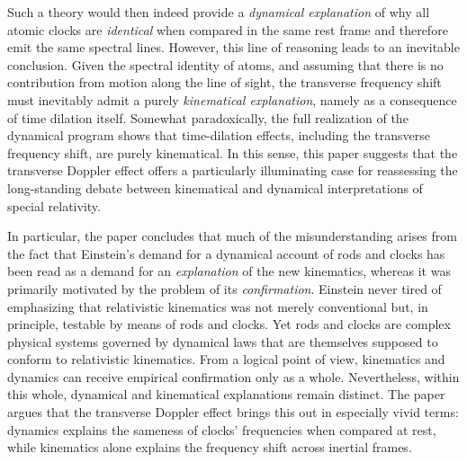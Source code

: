 \documentclass[pdflatex]{sn-jnl}
\newcommand{\tDe}{transverse Doppler effect\xspace}
\begin{document}
Such a theory would then indeed provide a \emph{dynamical explanation} of why all atomic clocks are \emph{identical} when compared in the same rest frame and therefore emit the same spectral lines. However, this line of reasoning leads to an inevitable conclusion. Given the spectral identity of atoms, and assuming that there is no contribution from motion along the line of sight, the transverse frequency shift must inevitably admit a purely \emph{kinematical explanation}, namely as a consequence of time dilation itself. Somewhat paradoxically, the full realization of the dynamical program shows that time-dilation effects, including the transverse frequency shift, are purely kinematical. In this sense, this paper suggests that the \tDe offers a particularly illuminating case for reassessing the long-standing debate between kinematical and dynamical interpretations of special relativity. 

In particular, the paper concludes that much of the misunderstanding arises from the fact that Einstein’s demand for a dynamical account of rods and clocks has been read as a demand for an \emph{explanation} of the new kinematics, whereas it was primarily motivated by the problem of its \emph{confirmation}. Einstein never tired of emphasizing that relativistic kinematics was not merely conventional but, in principle, testable by means of rods and clocks. Yet rods and clocks are complex physical systems governed by dynamical laws that are themselves supposed to conform to relativistic kinematics. From a logical point of view, kinematics and dynamics can receive empirical confirmation only as a whole. Nevertheless, within this whole, dynamical and kinematical explanations remain distinct. The paper argues that the \tDe brings this out in especially vivid terms: dynamics explains the sameness of clocks’ frequencies when compared at rest, while kinematics alone explains the frequency shift across inertial frames.
\end{document}
